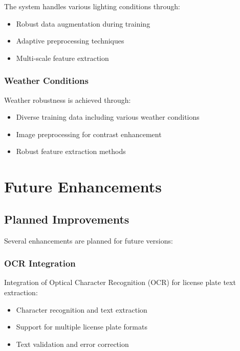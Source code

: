 \documentclass[12pt,a4paper]{article}
\begin{document}
The system handles various lighting conditions through:

\begin{itemize}
    \item Robust data augmentation during training
    \item Adaptive preprocessing techniques
    \item Multi-scale feature extraction
\end{itemize}

\subsubsection{Weather Conditions}

Weather robustness is achieved through:

\begin{itemize}
    \item Diverse training data including various weather conditions
    \item Image preprocessing for contrast enhancement
    \item Robust feature extraction methods
\end{itemize}

\section{Future Enhancements}

\subsection{Planned Improvements}

Several enhancements are planned for future versions:

\subsubsection{OCR Integration}

Integration of Optical Character Recognition (OCR) for license plate text extraction:

\begin{itemize}
    \item Character recognition and text extraction
    \item Support for multiple license plate formats
    \item Text validation and error correction
\end{itemize}
\end{document}
